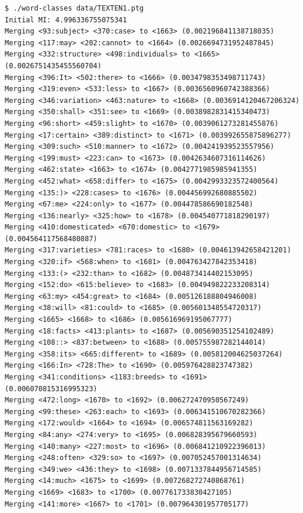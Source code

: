 \documentclass[12pt,a4paper]{article}
\begin{document}
\begin{verbatim}
$ ./word-classes data/TEXTEN1.ptg
Initial MI: 4.996336755075341
Merging <93:subject> <370:case> to <1663> (0.002196841138718035)
Merging <117:may> <202:cannot> to <1664> (0.0026694731952487845)
Merging <332:structure> <498:individuals> to <1665> (0.0026751435455560704)
Merging <396:It> <502:there> to <1666> (0.0034798353498711743)
Merging <319:even> <533:less> to <1667> (0.0036560960742388366)
Merging <346:variation> <463:nature> to <1668> (0.0036914120467206324)
Merging <350:shall> <351:see> to <1669> (0.0038982831415340473)
Merging <96:short> <459:slight> to <1670> (0.0039061273281455876)
Merging <17:certain> <389:distinct> to <1671> (0.003992655875896277)
Merging <309:such> <510:manner> to <1672> (0.004241939523557956)
Merging <199:must> <223:can> to <1673> (0.0042634607316114626)
Merging <462:state> <1663> to <1674> (0.0042771985985941355)
Merging <452:what> <658:differ> to <1675> (0.0042993323572400564)
Merging <135:)> <228:cases> to <1676> (0.004456992680885502)
Merging <67:me> <224:only> to <1677> (0.004478586690182548)
Merging <136:nearly> <325:how> to <1678> (0.004540771818290197)
Merging <410:domesticated> <670:domestic> to <1679> (0.004564117568480887)
Merging <317:varieties> <781:races> to <1680> (0.004613942658421201)
Merging <320:if> <568:when> to <1681> (0.004763427842353418)
Merging <133:(> <232:than> to <1682> (0.004873414402153095)
Merging <152:do> <615:believe> to <1683> (0.004949822233208314)
Merging <63:my> <454:great> to <1684> (0.005126188804946008)
Merging <38:will> <81:could> to <1685> (0.005601348554720317)
Merging <1665> <1668> to <1686> (0.005616969195067777)
Merging <18:facts> <413:plants> to <1687> (0.005690351254102489)
Merging <108::> <837:between> to <1688> (0.005755987282144014)
Merging <358:its> <665:different> to <1689> (0.005812004625037264)
Merging <166:In> <728:The> to <1690> (0.005976428823747382)
Merging <341:conditions> <1183:breeds> to <1691> (0.006070815316995323)
Merging <472:long> <1670> to <1692> (0.006272470950567249)
Merging <99:these> <263:each> to <1693> (0.006341510670282366)
Merging <172:would> <1664> to <1694> (0.006574811563169282)
Merging <84:any> <274:very> to <1695> (0.006828395679660593)
Merging <140:many> <227:most> to <1696> (0.006841210922396013)
Merging <248:often> <329:so> to <1697> (0.007052457001314634)
Merging <349:we> <436:they> to <1698> (0.0071337844956714585)
Merging <14:much> <1675> to <1699> (0.007268272740868761)
Merging <1669> <1683> to <1700> (0.007761733830427105)
Merging <141:more> <1667> to <1701> (0.007964301957705177)

\end{verbatim}
\end{document}
